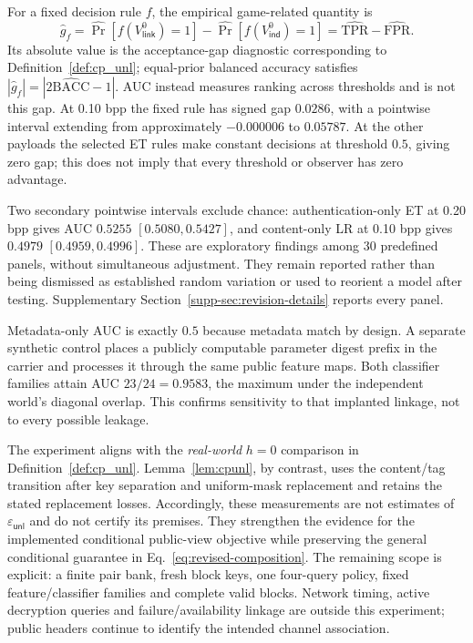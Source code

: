 \documentclass[pdflatex,sn-mathphys-num]{sn-jnl}%
\theoremstyle{definition}
\theoremstyle{game}
\theoremstyle{thmstyleone}%
\theoremstyle{thmstyletwo}%
\theoremstyle{thmstylethree}%
\begin{document}
For a fixed decision rule $f$, the empirical game-related quantity is
\begin{equation}\label{eq:empirical_cp_unl_adv}
\widehat g_f=
\widehat{\Pr}[f(V^0_{\mathsf{link}})=1]
-\widehat{\Pr}[f(V^0_{\mathsf{ind}})=1]
=\widehat{\mathrm{TPR}}-\widehat{\mathrm{FPR}}.
\end{equation}
Its absolute value is the acceptance-gap diagnostic corresponding to
Definition~\ref{def:cp_unl}; equal-prior balanced accuracy satisfies
$|\widehat g_f|=|2\widehat{\mathrm{BACC}}-1|$. AUC instead measures
ranking across thresholds and is not this gap. At 0.10 bpp the fixed
rule has signed gap $0.0286$, with a pointwise interval extending from
approximately $-0.000006$ to $0.05787$. At the other payloads the selected
ET rules make constant decisions at threshold $0.5$, giving zero gap;
this does not imply that every threshold or observer has zero advantage.

Two secondary pointwise intervals exclude chance: authentication-only
ET at 0.20 bpp gives AUC $0.5255$ $[0.5080,0.5427]$, and content-only LR
at 0.10 bpp gives $0.4979$ $[0.4959,0.4996]$. These are exploratory
findings among 30 predefined panels, without simultaneous adjustment.
They remain reported rather than being dismissed as established random
variation or used to reorient a model after testing. Supplementary
Section~\ref{supp-sec:revision-details} reports every panel.

Metadata-only AUC is exactly $0.5$ because metadata match by design.
A separate synthetic control places a publicly computable parameter
digest prefix in the carrier and processes it through the same public
feature maps. Both classifier families attain AUC $23/24=0.9583$, the
maximum under the independent world's diagonal overlap. This confirms
sensitivity to that implanted linkage, not to every possible leakage.

The experiment aligns with the \emph{real-world} $h=0$ comparison in
Definition~\ref{def:cp_unl}. Lemma~\ref{lem:cpunl}, by contrast, uses
the content/tag transition after key separation and uniform-mask
replacement and retains the stated replacement losses. Accordingly,
these measurements are not estimates of $\varepsilon_{\mathsf{unl}}$
and do not certify its premises. They strengthen the evidence for the
implemented conditional public-view objective while preserving the
general conditional guarantee in Eq.~\eqref{eq:revised-composition}.
The remaining scope is explicit: a finite pair bank, fresh block keys,
one four-query policy, fixed feature/classifier families and complete
valid blocks. Network timing, active decryption queries and
failure/availability linkage are outside this experiment; public headers
continue to identify the intended channel association.
\end{document}
